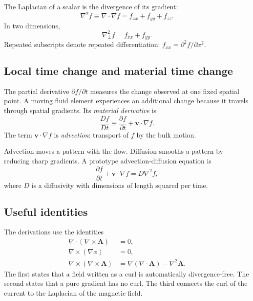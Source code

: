\documentclass[11pt]{article}
\newcommand{\vect}[1]{\bm{#1}}
\newcommand{\Lap}{\nabla_{\!\perp}^{2}}
\begin{document}
The Laplacian of a scalar is the divergence of its gradient:
\begin{equation}
\nabla^2 f\equiv\nabla\cdot\nabla f
=f_{xx}+f_{yy}+f_{zz}.
\end{equation}
In two dimensions,
\begin{equation}
\Lap f=f_{xx}+f_{yy}.
\end{equation}
Repeated subscripts denote repeated differentiation: $f_{xx}=\partial^2f/\partial x^2$.

\subsection{Local time change and material time change}

The partial derivative $\partial f/\partial t$ measures the change observed at one fixed spatial point. A moving fluid element experiences an additional change because it travels through spatial gradients. Its \emph{material derivative} is
\begin{equation}
\frac{D f}{D t}
\equiv
\frac{\partial f}{\partial t}+\vect{v}\cdot\nabla f.
\label{eq:material}
\end{equation}
The term $\vect{v}\cdot\nabla f$ is \emph{advection}: transport of $f$ by the bulk motion.

\begin{definitionbox}
Advection moves a pattern with the flow. Diffusion smooths a pattern by reducing sharp gradients. A prototype advection-diffusion equation is
\[
\frac{\partial f}{\partial t}+\vect{v}\cdot\nabla f=D\nabla^2f,
\]
where $D$ is a diffusivity with dimensions of length squared per time.
\end{definitionbox}

\subsection{Useful identities}

The derivations use the identities
\begin{align}
\nabla\cdot(\nabla\times\vect{A})&=0,\\
\nabla\times(\nabla\phi)&=0,\\
\nabla\times(\nabla\times\vect{A})
&=\nabla(\nabla\cdot\vect{A})-\nabla^2\vect{A}.
\end{align}
The first states that a field written as a curl is automatically divergence-free. The second states that a pure gradient has no curl. The third connects the curl of the current to the Laplacian of the magnetic field.
\end{document}

